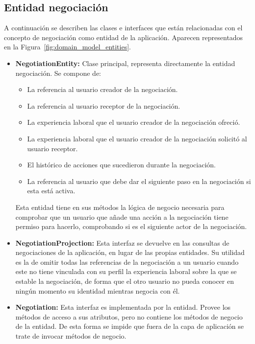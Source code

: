 \documentclass[a4paper, 12pt]{book}
\begin{document}
    \subsection{Entidad negociación}
    \label{subsec:negotiation_entity}
    A continuación se describen las clases e interfaces que están relacionadas con el concepto de negociación como entidad de la aplicación.
    Aparecen representados en la Figura~\ref{fig:domain_model_entities}.

    \begin{itemize}
        \item \textbf{NegotiationEntity:} Clase principal, representa directamente la entidad negociación.
        Se compone de:
        \begin{itemize}
            \item La referencia al usuario creador de la negociación.
            \item La referencia al usuario receptor de la negociación.
            \item La experiencia laboral que el usuario creador de la negociación ofreció.
            \item La experiencia laboral que el usuario creador de la negociación solicitó al usuario receptor.
            \item El histórico de acciones que sucedieron durante la negociación.
            \item La referencia al usuario que debe dar el siguiente paso en la negociación si esta está activa.
        \end{itemize}
        Esta entidad tiene en sus métodos la lógica de negocio necesaria para comprobar que un usuario que añade una acción a la negociación tiene permiso para hacerlo, comprobando si es el siguiente actor de la negociación.
        \item \textbf{NegotiationProjection:} Esta interfaz se devuelve en las consultas de negociaciones de la aplicación, en lugar de las propias entidades.
        Su utilidad es la de omitir todas las referencias de la negociación a un usuario cuando este no tiene vinculada con su perfil la experiencia laboral sobre la que se estable la negociación, de forma que el otro usuario no pueda conocer en ningún momento su identidad mientras negocia con él.
        \item \textbf{Negotiation:} Esta interfaz es implementada por la entidad. Provee los métodos de acceso a sus atributos, pero no contiene los métodos de negocio de la entidad. De esta forma se impide que fuera de la capa de aplicación se trate de invocar métodos de negocio.
    \end{itemize}
\end{document}
